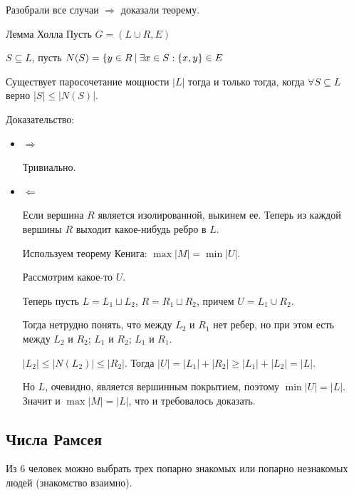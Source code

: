 Разобрали все случаи \( \Rightarrow \) доказали теорему.

\newpage

\begin{thrm}{Лемма Холла}{}
    Пусть \( G = (L \cup R, E) \)

    \( S \subseteq L \), пусть \( N(S) = \{ y \in R \ \vline \ \exists x \in S : \{ x, y \} \in E \)

    Существует паросочетание мощности \( |L| \) тогда и только тогда,
    когда \( \forall S \subseteq L \) верно \( |S| \leq |N(S)| \).
\end{thrm}

Доказательство:
\begin{itemize}
    \item
        \( \Rightarrow \)

        Тривиально.
    \item
        \( \Leftarrow \)

        Если вершина \( R \) является изолированной, выкинем ее.
        Теперь из каждой вершины \( R \) выходит какое-нибудь ребро в \( L \).

        Используем теорему Кенига: \( \max |M| = \min |U| \).

        Рассмотрим какое-то \( U \).

        Теперь пусть \( L = L_1 \sqcup L_2 \), \( R = R_1 \sqcup R_2 \), причем \( U = L_1 \cup R_2 \).

        Тогда нетрудно понять, что между \( L_2 \) и \( R_1 \) нет ребер,
        но при этом есть между \( L_2 \) и \( R_2 \); \( L_1 \) и \( R_2 \); \( L_1 \) и \( R_1 \).

        \( |L_2| \leq |N(L_2)| \leq |R_2| \).
        Тогда \( |U| = |L_1| + |R_2| \geq |L_1| + |L_2| = |L| \).

        Но \( L \), очевидно, является вершинным покрытием, поэтому
        \( \min |U| = |L| \). Значит и \( \max |M| = |L| \), что и требовалось доказать.
\end{itemize}

\subsection{Числа Рамсея}

\begin{exercise}{}{}
    Из \( 6 \) человек можно выбрать трех попарно знакомых или попарно незнакомых людей
    (знакомство взаимно).
\end{exercise}

